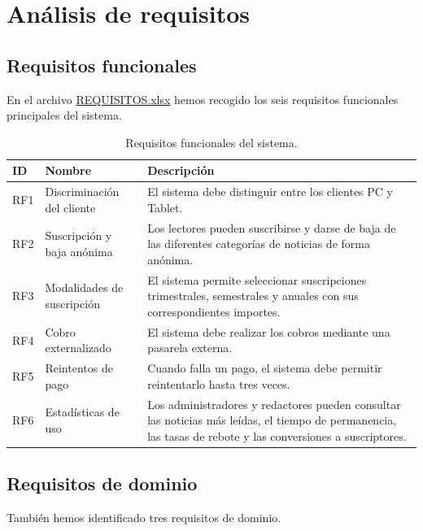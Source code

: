 \section{Análisis de requisitos}

\subsection{Requisitos funcionales}

En el archivo \href{Requisitos/REQUISITOS.xlsx}{REQUISITOS.xlsx} hemos recogido los seis requisitos funcionales principales del sistema.

\begin{table}[H]
\centering
\caption{Requisitos funcionales del sistema.}
\label{tab:requisitos-funcionales}
\small
\begin{tabularx}{\textwidth}{@{}p{}p{}X@{}}
\toprule
\textbf{ID} & \textbf{Nombre} & \textbf{Descripción} \\
\midrule
RF1 & Discriminación del cliente & El sistema debe distinguir entre los clientes PC y Tablet. \\
RF2 & Suscripción y baja anónima & Los lectores pueden suscribirse y darse de baja de las diferentes categorías de noticias de forma anónima. \\
RF3 & Modalidades de suscripción & El sistema permite seleccionar suscripciones trimestrales, semestrales y anuales con sus correspondientes importes. \\
RF4 & Cobro externalizado & El sistema debe realizar los cobros mediante una pasarela externa. \\
RF5 & Reintentos de pago & Cuando falla un pago, el sistema debe permitir reintentarlo hasta tres veces. \\
RF6 & Estadísticas de uso & Los administradores y redactores pueden consultar las noticias más leídas, el tiempo de permanencia, las tasas de rebote y las conversiones a suscriptores. \\
\bottomrule
\end{tabularx}
\end{table}

\subsection{Requisitos de dominio}

También hemos identificado tres requisitos de dominio.

